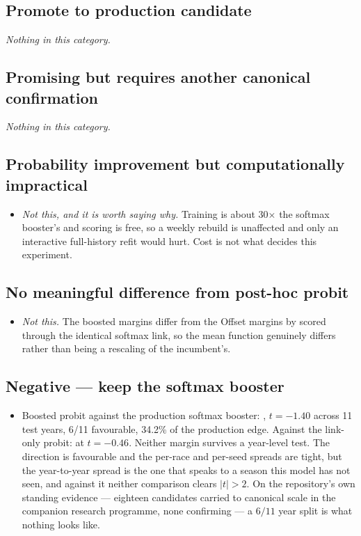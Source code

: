 \subsection*{Promote to production candidate}
\emph{Nothing in this category.}

\subsection*{Promising but requires another canonical confirmation}
\emph{Nothing in this category.}

\subsection*{Probability improvement but computationally impractical}
\begin{itemize}[leftmargin=1.3em]\itemsep3pt
\item \emph{Not this, and it is worth saying why.} Training is about 30$\times$ the softmax booster's and scoring is free, so a weekly rebuild is unaffected and only an interactive full-history refit would hurt. Cost is not what decides this experiment.
\end{itemize}

\subsection*{No meaningful difference from post-hoc probit}
\begin{itemize}[leftmargin=1.3em]\itemsep3pt
\item \emph{Not this.} The boosted margins differ from the Offset margins by  scored through the identical softmax link, so the mean function genuinely differs rather than being a rescaling of the incumbent's.
\end{itemize}

\subsection*{Negative --- keep the softmax booster}
\begin{itemize}[leftmargin=1.3em]\itemsep3pt
\item Boosted probit against the production softmax booster: , $t=-1.40$ across 11 test years, 6/11 favourable, 34.2\% of the production edge. Against the link-only probit:  at $t=-0.46$. Neither margin survives a year-level test. The direction is favourable and the per-race and per-seed spreads are tight, but the year-to-year spread is the one that speaks to a season this model has not seen, and against it neither comparison clears $|t|>2$. On the repository's own standing evidence --- eighteen candidates carried to canonical scale in the companion research programme, none confirming --- a $6/11$ year split is what nothing looks like.
\end{itemize}

